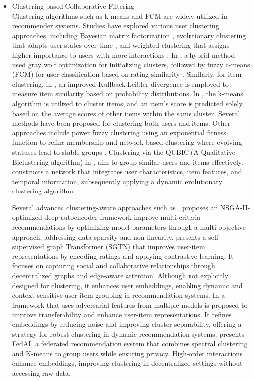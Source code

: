 \documentclass{article}
\begin{document}
\begin{itemize}
\item[a) ] Clustering-based Collaborative Filtering \\
Clustering algorithms such as k-means\cite{dakhel2011new, zahra2015novel, ranjan2018category, kant2017leaderrank} and FCM\cite{birtolo2013advances} are widely utilized in recommender systems. Studies have explored various user clustering approaches, including Bayesian matrix factorization \cite{bobadilla2018recommender}, evolutionary clustering that adapts user states over time \cite{liji2018improved}, and weighted clustering that assigns higher importance to users with more interactions \cite{salah2015dynamic}. In \cite{katarya2018recommender}, a hybrid method used gray wolf optimization for initializing clusters, followed by fuzzy c-means (FCM) for user classification based on rating similarity .
Similarly, for item clustering, in \cite{deng2019novel}, an improved Kullback-Leibler divergence is employed to measure item similarity based on probability distributions. In \cite{kant2017leaderrank}, the k-means algorithm is utilized to cluster items, and an item's score is predicted solely based on the average scores of other items within the same cluster. Several methods have been proposed for clustering both users and items. Other approaches include power fuzzy clustering using an exponential fitness function to refine membership \cite{treerattanapitak2012exponential} and network-based clustering where evolving statuses lead to stable groups \cite{chen2017evolutionary}. Clustering via the QUBIC (A Qualitative Biclustering algorithm) in \cite{singh2018impact}, aim to group similar users and items effectively. \cite{science2018dynamic} constructs a network that integrates user characteristics, item features, and temporal information, subsequently applying a dynamic evolutionary clustering algorithm.

Several advanced clustering-aware approaches such as \cite{rajput2025nsga}, proposes an NSGA-II-optimized deep autoencoder framework improve multi-criteria recommendations by optimizing model parameters through a multi-objective approach, addressing data sparsity and non-linearity. \cite{li2025self} presents a self-supervised graph Transformer (SGTN) that improves user-item representations by encoding ratings and applying contrastive learning. It focuses on capturing social and collaborative relationships through decentralized graphs and edge-aware attention. Although not explicitly designed for clustering, it enhances user embeddings, enabling dynamic and context-sensitive user-item grouping in recommendation systems. In \cite{qian2025ifm} a framework that uses adversarial features from multiple models is proposed to improve transferability and enhance user-item representations. It refines embeddings by reducing noise and improving cluster separability, offering a strategy for robust clustering in dynamic recommendation systems. \cite{he2025fedai} presents FedAI, a federated recommendation system that combines spectral clustering and K-means to group users while ensuring privacy. High-order interactions enhance embeddings, improving clustering in decentralized settings without accessing raw data.



\end{itemize}
\end{document}
